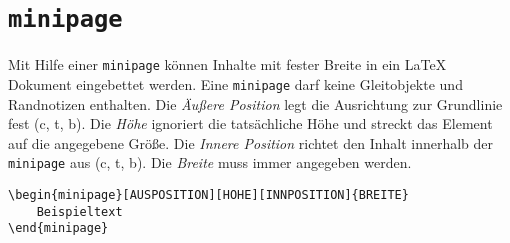 \section{\texttt{minipage}}
Mit Hilfe einer \texttt{minipage} können Inhalte mit fester Breite in ein \LaTeX{} Dokument eingebettet werden. Eine \texttt{minipage} darf keine Gleitobjekte und Randnotizen enthalten. Die \textit{Äußere Position} legt die Ausrichtung zur Grundlinie fest (c, t, b). Die \textit{Höhe} ignoriert die tatsächliche Höhe und streckt das Element auf die angegebene Größe. Die \textit{Innere Position} richtet den Inhalt innerhalb der \texttt{minipage} aus (c, t, b). Die \textit{Breite} muss immer angegeben werden.
\begin{lstlisting}[caption={minipage-Umgebung}]
\begin{minipage}[AUSPOSITION][HOHE][INNPOSITION]{BREITE}
	Beispieltext
\end{minipage}
\end{lstlisting}